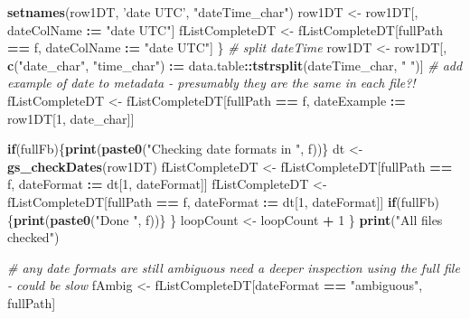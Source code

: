 \documentclass[]{article}
\newenvironment{Shaded}{\begin{snugshade}}{\end{snugshade}}
\newcommand{\KeywordTok}[1]{\textcolor[rgb]{0.13,0.29,0.53}{\textbf{#1}}}
\newcommand{\DecValTok}[1]{\textcolor[rgb]{0.00,0.00,0.81}{#1}}
\newcommand{\StringTok}[1]{\textcolor[rgb]{0.31,0.60,0.02}{#1}}
\newcommand{\CommentTok}[1]{\textcolor[rgb]{0.56,0.35,0.01}{\textit{#1}}}
\newcommand{\ControlFlowTok}[1]{\textcolor[rgb]{0.13,0.29,0.53}{\textbf{#1}}}
\newcommand{\OperatorTok}[1]{\textcolor[rgb]{0.81,0.36,0.00}{\textbf{#1}}}
\newcommand{\ErrorTok}[1]{\textcolor[rgb]{0.64,0.00,0.00}{\textbf{#1}}}
\newcommand{\NormalTok}[1]{#1}
\begin{document}
\begin{Shaded}
\begin{Highlighting}[]
{        \KeywordTok{setnames}\NormalTok{(row1DT, }\StringTok{'date UTC'}\NormalTok{, }\StringTok{"dateTime_char"}\NormalTok{)}
\NormalTok{        row1DT <-}\StringTok{ }\NormalTok{row1DT[, dateColName }\OperatorTok{:}\ErrorTok{=}\StringTok{ "date UTC"}\NormalTok{]}
\NormalTok{        fListCompleteDT <-}\StringTok{ }\NormalTok{fListCompleteDT[fullPath }\OperatorTok{==}\StringTok{ }\NormalTok{f, dateColName }\OperatorTok{:}\ErrorTok{=}\StringTok{ "date UTC"}\NormalTok{]}
\NormalTok{      \}}
      \CommentTok{# split dateTime}
\NormalTok{      row1DT <-}\StringTok{ }\NormalTok{row1DT[, }\KeywordTok{c}\NormalTok{(}\StringTok{"date_char"}\NormalTok{, }\StringTok{"time_char"}\NormalTok{) }\OperatorTok{:}\ErrorTok{=}\StringTok{ }\NormalTok{data.table}\OperatorTok{::}\KeywordTok{tstrsplit}\NormalTok{(dateTime_char, }\StringTok{" "}\NormalTok{)]}
      \CommentTok{# add example of date to metadata - presumably they are the same in each file?!}
\NormalTok{      fListCompleteDT <-}\StringTok{ }\NormalTok{fListCompleteDT[fullPath }\OperatorTok{==}\StringTok{ }\NormalTok{f, dateExample }\OperatorTok{:}\ErrorTok{=}\StringTok{ }\NormalTok{row1DT[}\DecValTok{1}\NormalTok{, date_char]]}
      
      \ControlFlowTok{if}\NormalTok{(fullFb)\{}\KeywordTok{print}\NormalTok{(}\KeywordTok{paste0}\NormalTok{(}\StringTok{"Checking date formats in "}\NormalTok{, f))\}}
\NormalTok{      dt <-}\StringTok{ }\KeywordTok{gs_checkDates}\NormalTok{(row1DT)}
\NormalTok{      fListCompleteDT <-}\StringTok{ }\NormalTok{fListCompleteDT[fullPath }\OperatorTok{==}\StringTok{ }\NormalTok{f, dateFormat }\OperatorTok{:}\ErrorTok{=}\StringTok{ }\NormalTok{dt[}\DecValTok{1}\NormalTok{, dateFormat]]}
\NormalTok{      fListCompleteDT <-}\StringTok{ }\NormalTok{fListCompleteDT[fullPath }\OperatorTok{==}\StringTok{ }\NormalTok{f, dateFormat }\OperatorTok{:}\ErrorTok{=}\StringTok{ }\NormalTok{dt[}\DecValTok{1}\NormalTok{, dateFormat]]}
      \ControlFlowTok{if}\NormalTok{(fullFb)\{}\KeywordTok{print}\NormalTok{(}\KeywordTok{paste0}\NormalTok{(}\StringTok{"Done "}\NormalTok{, f))\}}
\NormalTok{    \}}
\NormalTok{    loopCount <-}\StringTok{ }\NormalTok{loopCount }\OperatorTok{+}\StringTok{ }\DecValTok{1}
\NormalTok{  \}}
  \KeywordTok{print}\NormalTok{(}\StringTok{"All files checked"}\NormalTok{)}
  
  \CommentTok{# any date formats are still ambiguous need a deeper inspection using the full file - could be slow}
\NormalTok{  fAmbig <-}\StringTok{ }\NormalTok{fListCompleteDT[dateFormat }\OperatorTok{==}\StringTok{ "ambiguous"}\NormalTok{, fullPath]}
  
}
\end{Highlighting}
\end{Shaded}
\end{document}
